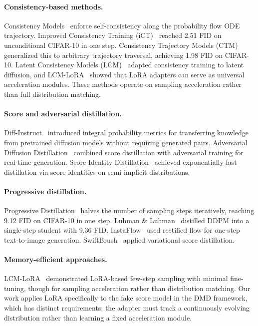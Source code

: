 \documentclass{article}
\theoremstyle{plain}
\theoremstyle{remark}
\begin{document}
\paragraph{Consistency-based methods.}
Consistency Models~\citep{song2023consistency} enforce self-consistency along the probability flow ODE trajectory. Improved Consistency Training (iCT)~\citep{song2024improved} reached 2.51 FID on unconditional CIFAR-10 in one step. Consistency Trajectory Models (CTM)~\citep{kim2024consistency} generalized this to arbitrary trajectory traversal, achieving 1.98 FID on CIFAR-10. Latent Consistency Models (LCM)~\citep{luo2023latent} adapted consistency training to latent diffusion, and LCM-LoRA~\citep{luo2023lcmlora} showed that LoRA adapters can serve as universal acceleration modules. These methods operate on sampling acceleration rather than full distribution matching.

\paragraph{Score and adversarial distillation.}
Diff-Instruct~\citep{luo2024diffinstruct} introduced integral probability metrics for transferring knowledge from pretrained diffusion models without requiring generated pairs. Adversarial Diffusion Distillation~\citep{sauer2023adversarial} combined score distillation with adversarial training for real-time generation. Score Identity Distillation~\citep{zhou2024score} achieved exponentially fast distillation via score identities on semi-implicit distributions.

\paragraph{Progressive distillation.}
Progressive Distillation~\citep{salimans2022progressive} halves the number of sampling steps iteratively, reaching 9.12 FID on CIFAR-10 in one step. Luhman \& Luhman~\citep{luhman2021knowledge} distilled DDPM into a single-step student with 9.36 FID. InstaFlow~\citep{liu2024instaflow} used rectified flow for one-step text-to-image generation. SwiftBrush~\citep{nguyen2024swiftbrush} applied variational score distillation.

\paragraph{Memory-efficient approaches.}
LCM-LoRA~\citep{luo2023lcmlora} demonstrated LoRA-based few-step sampling with minimal fine-tuning, though for sampling acceleration rather than distribution matching. Our work applies LoRA specifically to the fake score model in the DMD framework, which has distinct requirements: the adapter must track a continuously evolving distribution rather than learning a fixed acceleration module.
\end{document}
